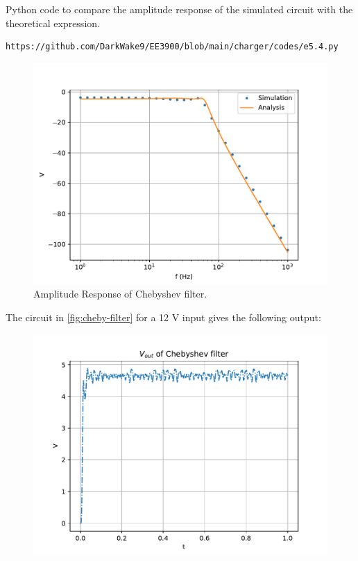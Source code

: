 \documentclass[journal,12pt,twocolumn]{IEEEtran}
\renewcommand\thesection{\arabic{section}}
\begin{document}
\begin{enumerate}[label=\thesection.\arabic*
,ref=\thesection.\theenumi]
Python code to compare the amplitude response
of the simulated circuit with the theoretical expression.
\begin{lstlisting}
https://github.com/DarkWake9/EE3900/blob/main/charger/codes/e5.4.py
\end{lstlisting}
\begin{figure}
	\includegraphics[width=\columnwidth]{figs/e5.4.pdf}
	\caption{Amplitude Response of Chebyshev filter.}
	\label{fig:sim-cheby}
\end{figure}
\vspace{2cm}
The circuit in \eqref{fig:cheby-filter} for a 12 V input gives the following output:
\begin{figure}[!ht]
	\begin{center}
		\includegraphics[width=\columnwidth]{./figs/e5.4b.pdf}
	\end{center}
	\label{fig:cheb_out}	
\end{figure}

\end{enumerate}
\end{document}
